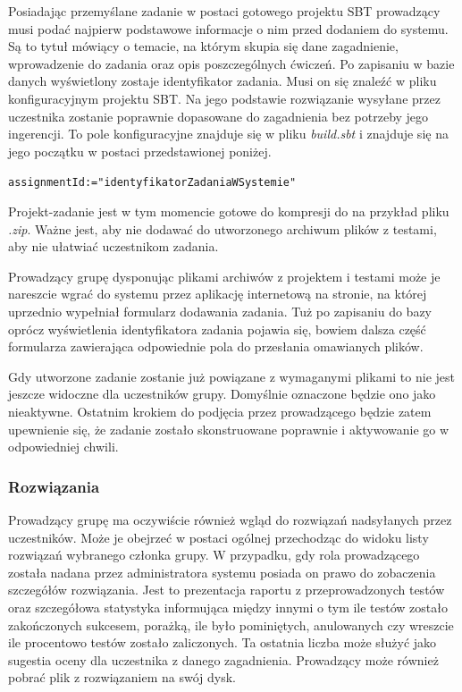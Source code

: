 \documentclass[brudnopis]{xmgr}
\begin{document}
Posiadając przemyślane zadanie w postaci gotowego projektu SBT prowadzący musi podać najpierw podstawowe informacje o nim przed dodaniem do systemu. Są to tytuł mówiący o temacie, na którym skupia się dane zagadnienie, wprowadzenie do zadania oraz opis poszczególnych ćwiczeń. Po zapisaniu w bazie danych wyświetlony zostaje identyfikator zadania. Musi on się znaleźć w pliku konfiguracyjnym projektu SBT. Na jego podstawie rozwiązanie wysyłane przez uczestnika zostanie poprawnie dopasowane do zagadnienia bez potrzeby jego ingerencji. To pole konfiguracyjne znajduje się w pliku \emph{build.sbt} i znajduje się na jego początku w postaci przedstawionej poniżej.

\begin{alltt}
assignmentId := "identyfikatorZadaniaWSystemie"
\end{alltt}

Projekt-zadanie jest w tym momencie gotowe do kompresji do na przykład pliku \emph{.zip}. Ważne jest, aby nie dodawać do utworzonego archiwum plików z testami, aby nie ułatwiać uczestnikom zadania. 

Prowadzący grupę dysponując plikami archiwów z projektem i testami może je nareszcie wgrać do systemu przez aplikację internetową na stronie, na której uprzednio wypełniał formularz dodawania zadania. Tuż po zapisaniu do bazy oprócz wyświetlenia identyfikatora zadania pojawia się, bowiem dalsza część formularza zawierająca odpowiednie pola do przesłania omawianych plików.

Gdy utworzone zadanie zostanie już powiązane z wymaganymi plikami to nie jest jeszcze widoczne dla uczestników grupy. Domyślnie oznaczone będzie ono jako nieaktywne. Ostatnim krokiem do podjęcia przez prowadzącego będzie zatem upewnienie się, że zadanie zostało skonstruowane poprawnie i aktywowanie go w odpowiedniej chwili.

\subsubsection{Rozwiązania}

Prowadzący grupę ma oczywiście również wgląd do rozwiązań nadsyłanych przez uczestników. Może je obejrzeć w postaci ogólnej przechodząc do widoku listy rozwiązań wybranego członka grupy. W przypadku, gdy rola prowadzącego została nadana przez administratora systemu posiada on prawo do zobaczenia szczegółów rozwiązania. Jest to prezentacja raportu z przeprowadzonych testów oraz szczegółowa statystyka informująca między innymi o tym ile testów zostało zakończonych sukcesem, porażką, ile było pominiętych, anulowanych czy wreszcie ile procentowo testów zostało zaliczonych. Ta ostatnia liczba może służyć jako sugestia oceny dla uczestnika z danego zagadnienia. Prowadzący może również pobrać plik z rozwiązaniem na swój dysk.
\end{document}
